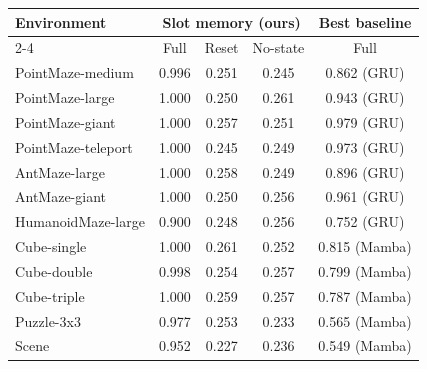 \begin{tabular}{lcccc}
\toprule
\multirow{2}{*}{Environment} & \multicolumn{3}{c}{Slot memory (ours)} & Best baseline\\
\cmidrule(lr){2-4}
 & Full & Reset & No-state & Full\\
\midrule
PointMaze-medium & 0.996 & 0.251 & 0.245 & 0.862 (GRU)\\
PointMaze-large & 1.000 & 0.250 & 0.261 & 0.943 (GRU)\\
PointMaze-giant & 1.000 & 0.257 & 0.251 & 0.979 (GRU)\\
PointMaze-teleport & 1.000 & 0.245 & 0.249 & 0.973 (GRU)\\
AntMaze-large & 1.000 & 0.258 & 0.249 & 0.896 (GRU)\\
AntMaze-giant & 1.000 & 0.250 & 0.256 & 0.961 (GRU)\\
HumanoidMaze-large & 0.900 & 0.248 & 0.256 & 0.752 (GRU)\\
Cube-single & 1.000 & 0.261 & 0.252 & 0.815 (Mamba)\\
Cube-double & 0.998 & 0.254 & 0.257 & 0.799 (Mamba)\\
Cube-triple & 1.000 & 0.259 & 0.257 & 0.787 (Mamba)\\
Puzzle-3x3 & 0.977 & 0.253 & 0.233 & 0.565 (Mamba)\\
Scene & 0.952 & 0.227 & 0.236 & 0.549 (Mamba)\\
\bottomrule
\end{tabular}
